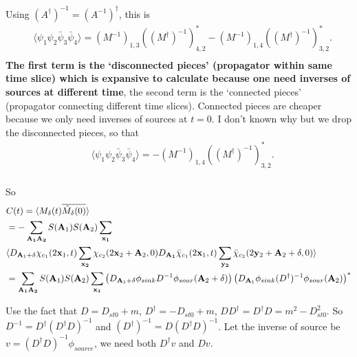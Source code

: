 Using $(A^{\dagger})^{-1}=(A^{-1})^{\dagger}$, this is
\begin{equation}
\begin{split}
&\langle \psi _1\psi_2 \bar{\psi} _3 \bar{\psi}_4\rangle = \left(M^{-1}\right)_{1,3}\left((M^{\dagger})^{-1}\right)_{4,2}^*- \left(M^{-1}\right)_{1,4}\left((M^{\dagger})^{-1}\right)_{3,2}^*.\\
\end{split}
\end{equation}
\textcolor[rgb]{1,0,0}{\textbf{The first term is the `disconnected pieces' (propagator within same time slice) which is expansive to calculate because one need inverses of sources at different time}, the second term is the `connected pieces' (propagator connecting different time slices). Connected pieces are cheaper because we only need inverses of sources at $t=0$.} I don't known why but we drop the disconnected pieces, so that
\begin{equation}
\begin{split}
&\langle \psi _1\psi_2 \bar{\psi} _3 \bar{\psi}_4\rangle = - \left(M^{-1}\right)_{1,4}\left((M^{\dagger})^{-1}\right)_{3,2}^*.\\
\end{split}
\end{equation}

So
\begin{equation}
\begin{split}
&C(t)=\langle M_{\delta}(t) \overline{\tilde{M} _{\delta}(0)}\rangle \\
&=-\sum _{\bf A _1 A_2}S({\bf A}_1)S({\bf A}_2)\sum _{\bf x _1}\\
&\langle D_{{\bf A}_1+\delta}\chi _{c_1} (2{\bf x}_1,t) \sum _{\bf x _2} \chi_{c_2}(2{\bf x}_2+{\bf A}_2,0)D_{\bf A_1}\bar{\chi}_{c_1}(2{\bf x}_1,t)\sum _{\bf y_2}\bar{\chi} _{c_2} (2{\bf y}_2+{\bf A}_2+\delta,0) \rangle\\
&=\sum _{\bf A _1 A_2}S({\bf A}_1)S({\bf A}_2)\sum _{\bf x _1} \left(D_{{\bf A}_1+\delta} \phi_{sink}D^{-1}\phi_{sour}({\bf A}_2+\delta)\right)\left(D_{{\bf A}_1} \phi_{sink}(D^{\dagger})^{-1}\phi_{sour}({\bf A}_2)\right)^*
\end{split}
\end{equation}

Use the fact that $D=D_{st0}+m$, $D^{\dagger}=-D_{st0}+m$, $DD^{\dagger}=D^{\dagger}D=m^2-D_{st0}^2$. So $D^{-1}=D^{\dagger} \left(D^{\dagger}D\right)^{-1}$ and $(D^{\dagger})^{-1}=D \left(D^{\dagger}D\right)^{-1}$. Let the inverse of source be $v=\left(D^{\dagger}D\right)^{-1} \phi _{source}$, we need both $D^{\dagger}v $ and $Dv$.

